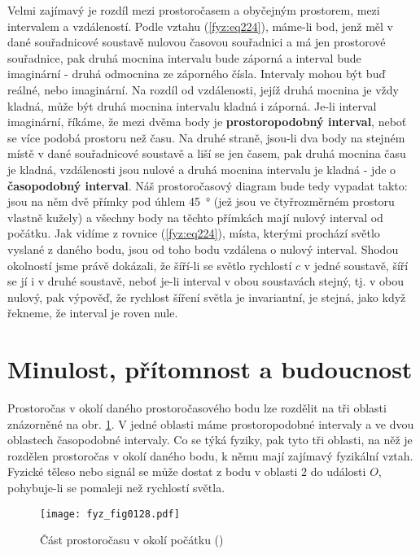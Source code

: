     Velmi zajímavý je rozdíl mezi prostoročasem a obyčejným prostorem, mezi intervalem a 
    vzdáleností. Podle vztahu (\ref{fyz:eq224}), máme-li bod, jenž měl v dané souřadnicové soustavě 
    nulovou časovou souřadnici a má jen prostorové souřadnice, pak druhá mocnina intervalu bude 
    záporná a interval bude imaginární - druhá odmocnina ze záporného čísla. Intervaly mohou být 
    buď reálné, nebo imaginární. Na rozdíl od vzdálenosti, jejíž druhá mocnina je vždy kladná, může 
    být druhá mocnina intervalu kladná i záporná. Je-li interval imaginární, říkáme, že mezi dvěma 
    body je \textbf{prostoropodobný interval}, neboť se více podobá prostoru než času. Na druhé 
    straně, jsou-li dva body na stejném místě v dané souřadnicové soustavě a liší se jen časem, pak 
    druhá mocnina času je kladná, vzdálenosti jsou nulové a druhá mocnina intervalu je kladná - jde 
    o \textbf{časopodobný interval}. Náš prostoročasový diagram bude tedy vypadat takto: jsou na 
    něm dvě přímky pod úhlem \qty{45}{\degree} (jež jsou ve čtyřrozměrném prostoru vlastně kužely) a 
    všechny body na těchto přímkách mají nulový interval od počátku. Jak vidíme z rovnice 
    (\ref{fyz:eq224}), místa, kterými prochází světlo vyslané z daného bodu, jsou od toho bodu 
    vzdálena o nulový interval. Shodou okolností jsme právě dokázali, že šíří-li se světlo 
    rychlostí \(c\) v jedné soustavě, šíří se jí i v druhé soustavě, neboť je-li interval v obou 
    soustavách stejný, tj. v obou nulový, pak výpověď, že rychlost šíření světla je invariantní, je 
    stejná, jako když řekneme, že interval je roven nule.
    
  \section{Minulost, přítomnost a budoucnost}\label{fyz:IchapXVIIsecIII}
    Prostoročas v okolí daného prostoročasového bodu lze rozdělit na tři oblasti znázorněné na obr. 
    \ref{fyz:fig0128}. V jedné oblasti máme prostoropodobné intervaly a ve dvou oblastech 
    časopodobné intervaly. Co se týká fyziky, pak tyto tři oblasti, na něž je rozdělen prostoročas 
    v okolí daného bodu, k němu mají zajímavý fyzikální vztah. Fyzické těleso nebo signál se může 
    dostat z bodu v oblasti \(2\) do události \(O\), pohybuje-li se pomaleji než rychlostí světla.

    \begin{figure}[ht!] %
      \centering
      \texttt{[image: fyz\_fig0128.pdf]}
      \caption{Část prostoročasu v okolí počátku
               (\cite[s.~241]{Feynman01})}
      \label{fyz:fig0128}
    \end{figure}
    
